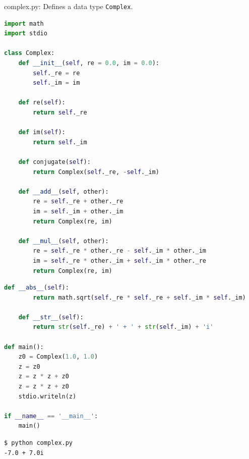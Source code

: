 \documentclass[8pt,a4paper,compress,handout]{beamer}
\begin{document}
\begin{frame}[fragile]
\begin{framed}
\tiny complex.py: Defines a data type \lstinline{Complex}.
\end{framed}

\begin{lstlisting}[language=Python]
import math
import stdio

class Complex:
    def __init__(self, re = 0.0, im = 0.0):
        self._re = re
        self._im = im

    def re(self):
        return self._re

    def im(self):
        return self._im

    def conjugate(self):
        return Complex(self._re, -self._im)

    def __add__(self, other):
        re = self._re + other._re
        im = self._im + other._im
        return Complex(re, im)

    def __mul__(self, other):
        re = self._re * other._re - self._im * other._im
        im = self._re * other._im + self._im * other._re
        return Complex(re, im)
\end{lstlisting}
\end{frame}

\begin{frame}[fragile]
\begin{lstlisting}[language=Python]
    def __abs__(self):
        return math.sqrt(self._re * self._re + self._im * self._im)

    def __str__(self):
        return str(self._re) + ' + ' + str(self._im) + 'i'

def main():
    z0 = Complex(1.0, 1.0)
    z = z0
    z = z * z + z0
    z = z * z + z0
    stdio.writeln(z)

if __name__ == '__main__':
    main()
\end{lstlisting}

\begin{lstlisting}[language={}]
$ python complex.py 
-7.0 + 7.0i
\end{lstlisting}
\end{frame}
\end{document}
